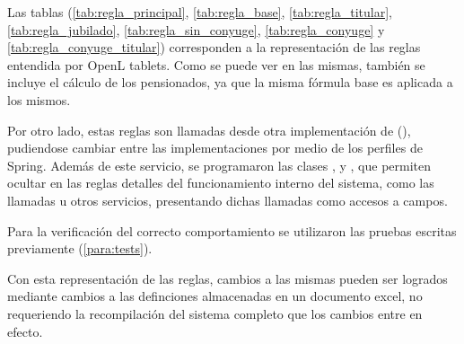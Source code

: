 Las tablas (\cref{tab:regla_principal}, \cref{tab:regla_base}, \cref{tab:regla_titular}, \cref{tab:regla_jubilado}, \cref{tab:regla_sin_conyuge}, \cref{tab:regla_conyuge} y \cref{tab:regla_conyuge_titular}) corresponden a la representación de las reglas entendida por OpenL tablets. Como se puede ver en las mismas, también se incluye el cálculo de los pensionados, ya que la misma fórmula base es aplicada a los mismos.

Por otro lado, estas reglas son llamadas desde otra implementación de (), pudiendose cambiar entre las implementaciones por medio de los perfiles de Spring. Además de este servicio, se programaron las clases ,  y , que permiten ocultar en las reglas detalles del funcionamiento interno del sistema, como las llamadas u otros servicios, presentando dichas llamadas como accesos a campos.

Para la verificación del correcto comportamiento se utilizaron las pruebas escritas previamente (\cref{para:tests}).

Con esta representación de las reglas, cambios a las mismas pueden ser logrados mediante cambios a las definciones almacenadas en un documento excel, no requeriendo la recompilación del sistema completo que los cambios entre en efecto.
